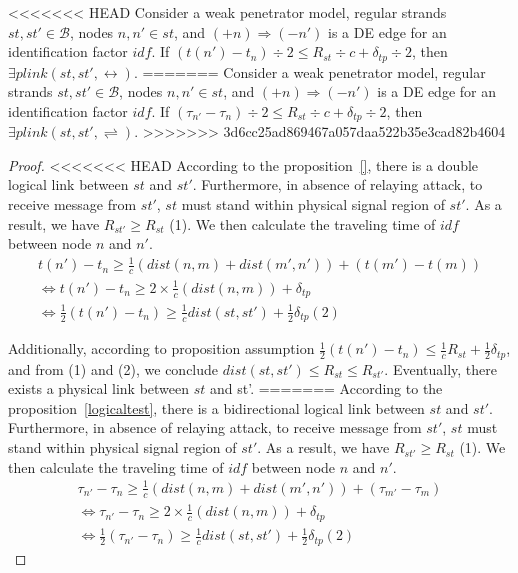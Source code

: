 \begin{flushleft}
\begin{flushleft}
\begin{Definition}
\begin{itemize}
\begin{Definition}
\begin{Proposition}\label{difrange}
<<<<<<< HEAD
Consider a weak penetrator model, regular strands $st, st' \in \mathcal{B}$, nodes $n,n' \in st$, and $(+n) \Rightarrow (-n')$ is a DE edge for an identification factor $idf$. If $(t(n') - t_n)\div 2 \le R_{st} \div c + \delta_{tp} \div 2$, then $\exists plink(st,st',\leftrightarrow)$. 
=======
Consider a weak penetrator model, regular strands $st, st' \in \mathcal{B}$, nodes $n,n' \in st$, and $(+n) \Rightarrow (-n')$ is a DE edge for an identification factor $idf$. If $(\tau_{n'} - \tau_{n})\div 2 \le R_{st} \div c + \delta_{tp} \div 2$, then $\exists plink(st,st',\rightleftharpoons)$. 
>>>>>>> 3d6cc25ad869467a057daa522b35e3cad82b4604
\end{Proposition}

\begin{proof}

<<<<<<< HEAD
According to the proposition~\ref{}, there is a double logical link between $st$ and $st'$. Furthermore, in absence of relaying attack, to receive message from $st'$, $st$ must stand within physical signal region of $st'$. As a result, we have $R_{st'} \ge R_{st}$ (1). We then calculate the traveling time of $idf$ between node $n$ and $n'$. 
\begin{equation*}
\begin{split}
  	 t(n') - t_n \ge \frac 1 {c}(dist(n,m) + dist(m', n')) + (t(m') - t(m)) \\ \Leftrightarrow 
	 t(n') - t_n \ge 2 \times \frac 1 {c}(dist(n,m)) + \delta_{tp} \\ \Leftrightarrow 
	 \frac 1 {2} (t(n') - t_n) \ge \frac 1 {c} dist(st,st') + \frac 1 {2} \delta_{tp} (2)
\end{split}
\end{equation*}

Additionally, according to proposition assumption $ \frac 1 {2} (t(n') - t_n) \le \frac 1 {c} R_{st} + \frac 1 {2} \delta_{tp} $, and from (1) and (2), we conclude $dist(st,st') \le R_{st} \le R_{st'} $. Eventually, there exists a physical link between $st$ and st'.
=======
According to the proposition~\ref{logicaltest}, there is a bidirectional logical link between $st$ and $st'$. Furthermore, in absence of relaying attack, to receive message from $st'$, $st$ must stand within physical signal region of $st'$. As a result, we have $R_{st'} \ge R_{st}$ (1). We then calculate the traveling time of $idf$ between node $n$ and $n'$. 
\begin{equation*}
\begin{split}
  	 \tau_{n'} - \tau_{n} \ge \frac 1 {c}(dist(n,m) + dist(m', n')) + (\tau_{m'} - \tau_{m}) \\ \Leftrightarrow 
	 \tau_{n'} - \tau_{n} \ge 2 \times \frac 1 {c}(dist(n,m)) + \delta_{tp} \\ \Leftrightarrow 
	 \frac 1 {2} (\tau_{n'} - \tau_{n}) \ge \frac 1 {c} dist(st,st') + \frac 1 {2} \delta_{tp} (2)
\end{split}
\end{equation*}


\end{proof}
\end{Definition}
\end{itemize}
\end{Definition}
\end{flushleft}
\end{flushleft}
